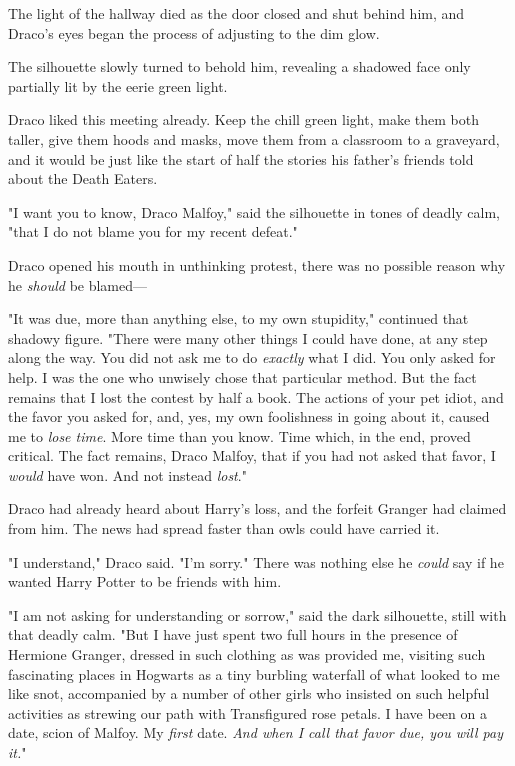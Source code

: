 The light of the hallway died as the door closed and shut behind him, and
Draco's eyes began the process of adjusting to the dim glow.

The silhouette slowly turned to behold him, revealing a shadowed face only
partially lit by the eerie green light.

Draco liked this meeting already. Keep the chill green light, make them both
taller, give them hoods and masks, move them from a classroom to a graveyard,
and it would be just like the start of half the stories his father's friends
told about the Death Eaters.

"I want you to know, Draco Malfoy," said the silhouette in tones of deadly
calm, "that I do not blame you for my recent defeat."

Draco opened his mouth in unthinking protest, there was no possible reason why
he \emph{should} be blamed—

"It was due, more than anything else, to my own stupidity," continued that
shadowy figure. "There were many other things I could have done, at any step
along the way. You did not ask me to do \emph{exactly} what I did. You only
asked for help. I was the one who unwisely chose that particular method. But
the fact remains that I lost the contest by half a book. The actions of your
pet idiot, and the favor you asked for, and, yes, my own foolishness in going
about it, caused me to \emph{lose time}. More time than you know. Time which,
in the end, proved critical. The fact remains, Draco Malfoy, that if you had
not asked that favor, I \emph{would} have won. And not{\el} instead{\el}
\emph{lost}."

Draco had already heard about Harry's loss, and the forfeit Granger had claimed
from him. The news had spread faster than owls could have carried it.

"I understand," Draco said. "I'm sorry." There was nothing else he \emph{could}
say if he wanted Harry Potter to be friends with him.

"I am not asking for understanding or sorrow," said the dark silhouette, still
with that deadly calm. "But I have just spent two full hours in the presence of
Hermione Granger, dressed in such clothing as was provided me, visiting such
fascinating places in Hogwarts as a tiny burbling waterfall of what looked to
me like snot, accompanied by a number of other girls who insisted on such
helpful activities as strewing our path with Transfigured rose petals. I have
been on a date, scion of Malfoy. My \emph{first} date. \emph{And when I call
that favor due, you will pay it.}"

